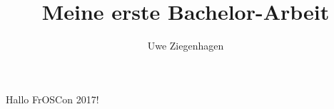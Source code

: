 \documentclass[12pt,ngerman]{scrreprt}
\author{Uwe Ziegenhagen}
\title{Meine erste Bachelor-Arbeit}
\begin{document}
\maketitle


Hallo FrOSCon 2017!
\end{document}

